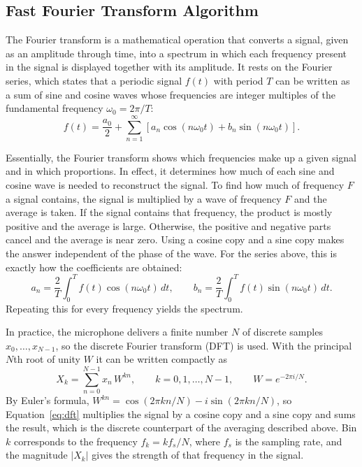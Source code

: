 \subsection{Fast Fourier Transform Algorithm}
\label{subsec:fft}

The Fourier transform is a mathematical operation that converts a signal,
given as an amplitude through time, into a spectrum in which each frequency
present in the signal is displayed together with its amplitude. It rests on
the Fourier series, which states that a periodic signal $f(t)$ with period
$T$ can be written as a sum of sine and cosine waves whose frequencies are
integer multiples of the fundamental frequency $\omega_0 = 2\pi/T$:
\begin{equation}
  f(t) = \frac{a_0}{2} + \sum_{n=1}^{\infty}
  \left[ a_n \cos(n\omega_0 t) + b_n \sin(n\omega_0 t) \right].
  \label{eq:fourier-series}
\end{equation}

Essentially, the Fourier transform shows which frequencies make up a given
signal and in which proportions. In effect, it determines how much of each
sine and cosine wave is needed to reconstruct the signal. To find how much of
frequency $F$ a signal contains, the signal is multiplied by a wave of
frequency $F$ and the average is taken. If the signal contains that
frequency, the product is mostly positive and the average is large.
Otherwise, the positive and negative parts cancel and the average is near
zero. Using a cosine copy and a sine copy makes the answer independent of the
phase of the wave. For the series above, this is exactly how the coefficients
are obtained:
\begin{equation}
  a_n = \frac{2}{T} \int_{0}^{T} f(t) \cos(n\omega_0 t)\, dt,
  \qquad
  b_n = \frac{2}{T} \int_{0}^{T} f(t) \sin(n\omega_0 t)\, dt.
  \label{eq:fourier-coefficients}
\end{equation}
Repeating this for every frequency yields the spectrum.

In practice, the microphone delivers a finite number $N$ of discrete samples
$x_0, \dots, x_{N-1}$, so the discrete Fourier transform (DFT) is used. With
the principal $N$th root of unity $W$ it can be written compactly
as~\cite{cooley1965algorithm}
\begin{equation}
  X_k = \sum_{n=0}^{N-1} x_n \, W^{kn},
  \qquad k = 0, 1, \dots, N-1,
  \qquad W = e^{-2\pi i / N}.
  \label{eq:dft}
\end{equation}
By Euler's formula,
$W^{kn} = \cos(2\pi kn/N) - i\sin(2\pi kn/N)$, so
Equation~\ref{eq:dft} multiplies the signal by a cosine copy and a sine copy
and sums the result, which is the discrete counterpart of the averaging
described above. Bin $k$ corresponds to the frequency $f_k = k f_s / N$,
where $f_s$ is the sampling rate, and the magnitude $|X_k|$ gives the
strength of that frequency in the signal.

